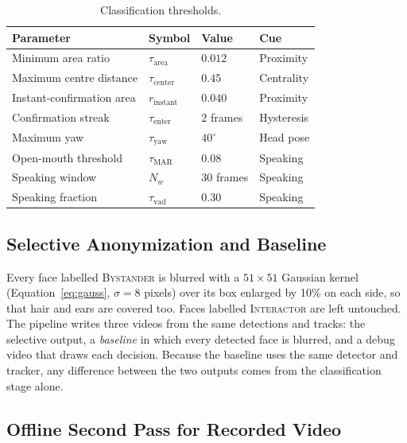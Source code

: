 \begin{table}[htbp]
\begin{singlespace}
\centering
\caption{Classification thresholds.}
\label{tab:params}
\renewcommand{\arraystretch}{1.3}
\begin{tabular}{@{}llll@{}}
\toprule
\textbf{Parameter} & \textbf{Symbol} & \textbf{Value} & \textbf{Cue} \\
\midrule
Minimum area ratio            & $\tau_{\mathrm{area}}$   & $0.012$     & Proximity \\
Maximum centre distance       & $\tau_{\mathrm{center}}$ & $0.45$      & Centrality \\
Instant-confirmation area     & $r_{\mathrm{instant}}$   & $0.040$     & Proximity \\
Confirmation streak           & $\tau_{\mathrm{enter}}$  & 2 frames    & Hysteresis \\
Maximum yaw                   & $\tau_{\mathrm{yaw}}$    & $40^\circ$  & Head pose \\
Open-mouth threshold          & $\tau_{\mathrm{MAR}}$    & $0.08$      & Speaking \\
Speaking window               & $N_w$                    & 30 frames   & Speaking \\
Speaking fraction             & $\tau_{\mathrm{vad}}$    & $0.30$      & Speaking \\
\bottomrule
\end{tabular}
\end{singlespace}
\end{table}

\subsection{Selective Anonymization and Baseline}
\label{sec:anon}

Every face labelled \textsc{Bystander} is blurred with a $51 \times 51$ Gaussian kernel
(Equation~\ref{eq:gauss}, $\sigma = 8$ pixels) over its box enlarged by 10\% on each side,
so that hair and ears are covered too. Faces labelled \textsc{Interactor} are left
untouched. The pipeline writes three videos from the same detections and tracks: the
selective output, a \emph{baseline} in which every detected face is blurred, and a debug
video that draws each decision. Because the baseline uses the same detector and tracker,
any difference between the two outputs comes from the classification stage alone.

\subsection{Offline Second Pass for Recorded Video}
\label{sec:secondpass}

